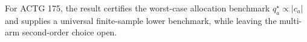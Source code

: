 For ACTG 175, the result certifies the worst-case allocation benchmark \(q_a^\star\propto|c_a|\) and supplies a universal finite-sample lower benchmark, while leaving the multi-arm second-order choice open.